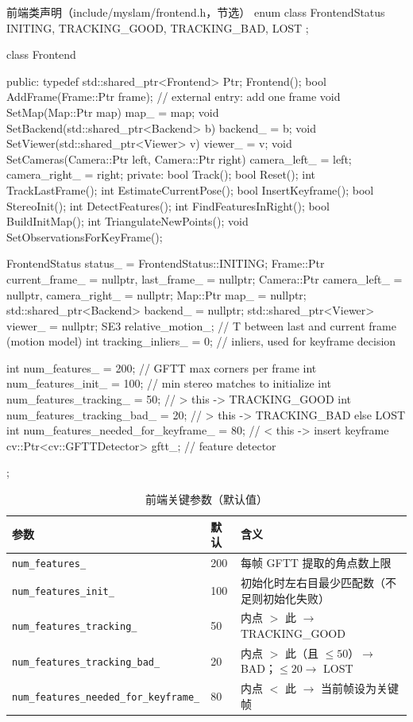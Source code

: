\begin{codebox}[C++]{前端类声明（include/myslam/frontend.h，节选）}
enum class FrontendStatus { INITING, TRACKING_GOOD, TRACKING_BAD, LOST };

class Frontend {
   public:
    typedef std::shared_ptr<Frontend> Ptr;
    Frontend();
    bool AddFrame(Frame::Ptr frame);            // external entry: add one frame
    void SetMap(Map::Ptr map) { map_ = map; }
    void SetBackend(std::shared_ptr<Backend> b) { backend_ = b; }
    void SetViewer(std::shared_ptr<Viewer> v) { viewer_ = v; }
    void SetCameras(Camera::Ptr left, Camera::Ptr right) {
        camera_left_ = left; camera_right_ = right;
    }
   private:
    bool Track();           bool Reset();
    int  TrackLastFrame();  int  EstimateCurrentPose();
    bool InsertKeyframe();  bool StereoInit();
    int  DetectFeatures();  int  FindFeaturesInRight();
    bool BuildInitMap();    int  TriangulateNewPoints();
    void SetObservationsForKeyFrame();

    FrontendStatus status_ = FrontendStatus::INITING;
    Frame::Ptr current_frame_ = nullptr, last_frame_ = nullptr;
    Camera::Ptr camera_left_ = nullptr, camera_right_ = nullptr;
    Map::Ptr map_ = nullptr;
    std::shared_ptr<Backend> backend_ = nullptr;
    std::shared_ptr<Viewer>  viewer_  = nullptr;
    SE3 relative_motion_;       // T between last and current frame (motion model)
    int tracking_inliers_ = 0;  // inliers, used for keyframe decision

    int num_features_ = 200;                    // GFTT max corners per frame
    int num_features_init_ = 100;               // min stereo matches to initialize
    int num_features_tracking_ = 50;            // > this -> TRACKING_GOOD
    int num_features_tracking_bad_ = 20;        // > this -> TRACKING_BAD else LOST
    int num_features_needed_for_keyframe_ = 80; // < this -> insert keyframe
    cv::Ptr<cv::GFTTDetector> gftt_;            // feature detector
};
\end{codebox}

\begin{table}[H]\centering\small
\caption{前端关键参数（默认值）}
\label{tab:sys-frontend-params}
\begin{tabular}{lll}
\toprule
参数 & 默认 & 含义 \\
\midrule
\texttt{num\_features\_} & 200 & 每帧 GFTT 提取的角点数上限 \\
\texttt{num\_features\_init\_} & 100 & 初始化时左右目最少匹配数（不足则初始化失败） \\
\texttt{num\_features\_tracking\_} & 50 & 内点 $>$ 此 $\to$ TRACKING\_GOOD \\
\texttt{num\_features\_tracking\_bad\_} & 20 & 内点 $>$ 此（且 $\le50$）$\to$ BAD；$\le20\to$ LOST \\
\texttt{num\_features\_needed\_for\_keyframe\_} & 80 & 内点 $<$ 此 $\to$ 当前帧设为关键帧 \\
\bottomrule
\end{tabular}
\end{table}

